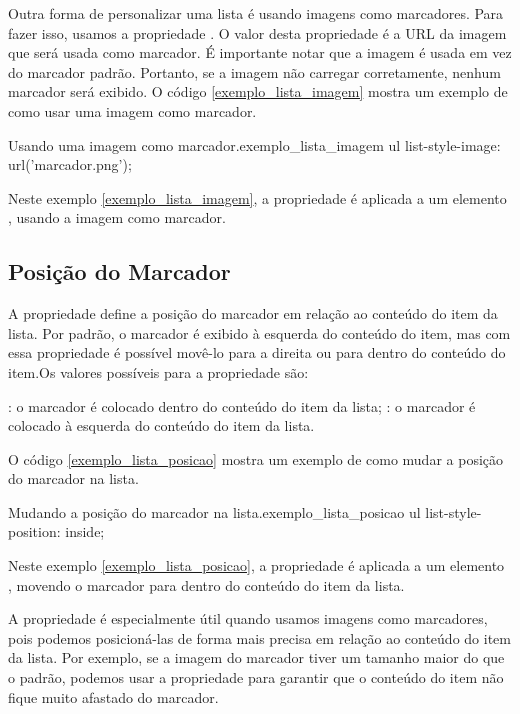 Outra forma de personalizar uma lista é usando imagens como marcadores. Para fazer isso, usamos a propriedade . O valor desta propriedade é a URL da imagem que será usada como marcador. É importante notar que a imagem é usada em vez do marcador padrão. Portanto, se a imagem não carregar corretamente, nenhum marcador será exibido. O código \ref{exemplo_lista_imagem} mostra um exemplo de como usar uma imagem como marcador.

\begin{csscode}{Usando uma imagem como marcador.}{exemplo_lista_imagem}
ul {
    list-style-image: url('marcador.png');
}
\end{csscode}

Neste exemplo \ref{exemplo_lista_imagem}, a propriedade  é aplicada a um elemento , usando a imagem  como marcador.

\subsection{Posição do Marcador}

A propriedade  define a posição do marcador em relação ao conteúdo do item da lista. Por padrão, o marcador é exibido à esquerda do conteúdo do item, mas com essa propriedade é possível movê-lo para a direita ou para dentro do conteúdo do item.Os valores possíveis para a propriedade  são:

: o marcador é colocado dentro do conteúdo do item da lista;
: o marcador é colocado à esquerda do conteúdo do item da lista.

O código \ref{exemplo_lista_posicao} mostra um exemplo de como mudar a posição do marcador na lista.

\begin{csscode}{Mudando a posição do marcador na lista.}{exemplo_lista_posicao}
ul {
    list-style-position: inside;
}
\end{csscode}

Neste exemplo \ref{exemplo_lista_posicao}, a propriedade  é aplicada a um elemento , movendo o marcador para dentro do conteúdo do item da lista.

A propriedade  é especialmente útil quando usamos imagens como marcadores, pois podemos posicioná-las de forma mais precisa em relação ao conteúdo do item da lista. Por exemplo, se a imagem do marcador tiver um tamanho maior do que o padrão, podemos usar a propriedade  para garantir que o conteúdo do item não fique muito afastado do marcador.

